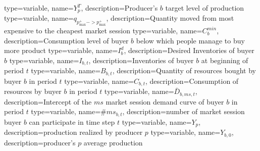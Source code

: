 
{%
  type=variable,%
  name={$Y^T_p$},%
  description={Producer's $b$ target level of production} 
}
{%
  type=variable,%
  name={$q_{p^+_{\max} -> p^+_{\max}}$},%
  description={Quantity moved from most expensive to the cheapest market session} 
}
{%
  type=variable,%
  name={$C^{min}_b$},%
  description={Consumption level of buyer $b$ below which people manage to buy more product} 
}
{%
  type=variable,%
  name={$I^d_b$},%
  description={Desired Inventories of buyer $b$} 
}
{%
  type=variable,%
  name={$I_{b,t}$},%
  description={Inventories of buyer $b$ at beginning of period $t$} 
}
{%
  type=variable,%
  name={$B_{b,t}$},%
  description={Quantity of resources bought by buyer $b$ in period $t$} 
}
{%
  type=variable,%
  name={$C_{b,t}$},%
  description={Consumption of resources by buyer $b$ in period $t$} 
}
{%
  type=variable,%
  name={$\bar{D}_{b,ms,t}$},%
  description={Intercept of the $ms$ market session demand curve of buyer $b$ in period $t$} 
}
{%
  type=variable,%
  name={$\#ms_{b,t}$},%
  description={number of market session buyer $b$ can participate in time step $t$} 
}
{%
  type=variable,%
  name={$Y_{p}$},%
  description={production realized by producer $p$} 
}
{%
  type=variable,%
  name={$Y_{b,0}$},%
  description={producer's $p$ average production} 
}


